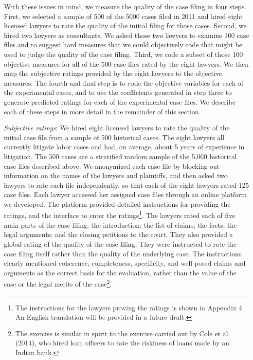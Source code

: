 \documentclass[oneside,12pt]{article}
\begin{document}
With these issues in mind, we measure the quality of the case filing in four steps. First, we selected a sample of 500 of the 5000 cases filed in 2011 and hired eight licensed lawyers to rate the quality of the initial filing for those cases. Second, we hired two lawyers as consultants. We asked those two lawyers to examine 100 case files and to suggest hard measures that we could objectively code that might be used to judge the quality of the case filing. Third, we code a subset of those 100 objective measures for all of the 500 case files rated by the eight lawyers. We then map the subjective ratings provided by the eight lawyers to the objective measures. The fourth and final step is to code the objective variables for each of the experimental cases, and to use the coefficients generated in step three to generate predicted ratings for each of the experimental case files. We describe each of these steps in more detail in the remainder of this section. 

\emph{Subjective ratings}: We hired eight licensed lawyers to rate the quality of the initial case file from a sample of 500 historical cases. The eight lawyers all currently litigate labor cases and had, on average, about 5 years of experience in litigation. The 500 cases are a stratified random sample of the 5,000 historical case files described above. We anonymized each case file by blocking out information on the names of the lawyers and plaintiffs, and then asked two lawyers to rate each file independently, so that each of the eight lawyers rated 125 case files. Each lawyer accessed her assigned case files through an online platform we developed. The platform provided detailed instructions for providing the ratings, and the interface to enter the ratings\footnote{The instructions for the lawyers proving the ratings is shown in Appendix 4. An English translation will be provided in a future draft.}.  The lawyers rated each of five main parts of the case filing: the introduction; the list of claims; the facts; the legal arguments; and the closing petitions to the court. They also provided a global rating of the quality of the case filing. They were instructed to rate the case filing itself rather than the quality of the underlying case. The instructions clearly mentioned coherence, completeness, specificity, and well posed claims and arguments as the correct basis for the evaluation, rather than the value of the case or the legal merits of the case\footnote{The exercise is similar in spirit to the exercise carried out by Cole et al. (2014), who hired loan officers to rate the riskiness of loans made by an Indian bank.}. 
\end{document}
